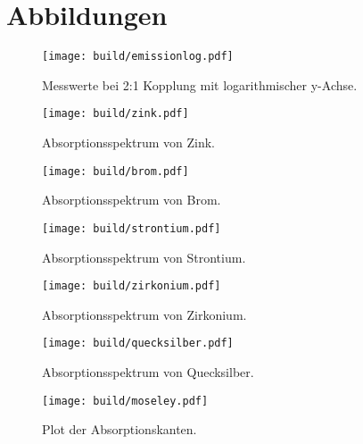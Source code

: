 \section{Abbildungen}
\label{sec:anhang}
\begin{figure}
    \centering
    \texttt{[image: build/emissionlog.pdf]}
    \caption{Messwerte bei 2:1 Kopplung mit logarithmischer y-Achse.}
    \label{fig:emissionlog}
\end{figure}

\begin{figure}
    \centering
    \texttt{[image: build/zink.pdf]}
    \caption{Absorptionsspektrum von Zink.}
    \label{fig:zink}
\end{figure}

\begin{figure}
      \centering
      \texttt{[image: build/brom.pdf]}
      \caption{Absorptionsspektrum von Brom.}
      \label{fig:brom}
\end{figure}

\begin{figure}
      \centering
      \texttt{[image: build/strontium.pdf]}
      \caption{Absorptionsspektrum von Strontium.}
      \label{fig:strontium}
\end{figure}

\begin{figure}
      \centering
      \texttt{[image: build/zirkonium.pdf]}
      \caption{Absorptionsspektrum von Zirkonium.}
      \label{fig:zirkonium}
\end{figure}

\begin{figure}
      \centering
      \texttt{[image: build/quecksilber.pdf]}
      \caption{Absorptionsspektrum von Quecksilber.}
      \label{fig:quecksilber}
\end{figure}

\begin{figure}
    \centering
    \texttt{[image: build/moseley.pdf]}
    \caption{Plot der Absorptionskanten.}
    \label{fig:abkanten}
\end{figure}
